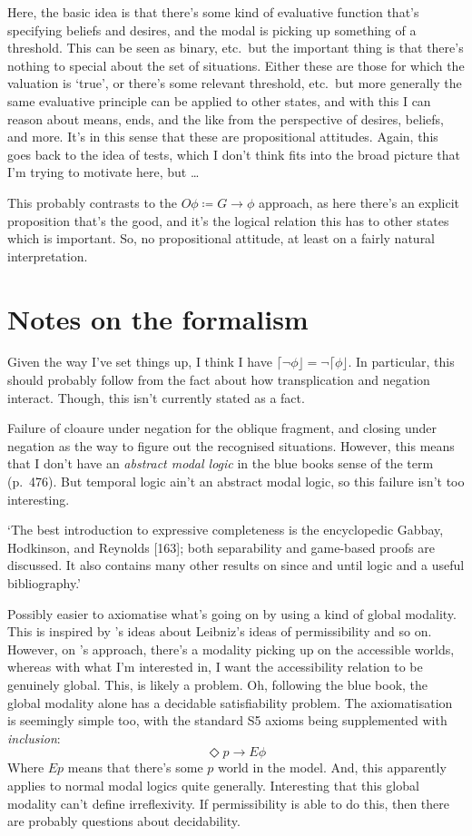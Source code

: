 \documentclass[10pt]{article}
\newcommand{\lattn}{\ensuremath{\lceil}}
\newcommand{\rattn}{\ensuremath{\rfloor}}
\newcommand{\attn}[1]{\ensuremath{\mathord{\lattn{#1}\rattn}}}
\begin{document}
Here, the basic idea is that there's some kind of evaluative function that's specifying beliefs and desires, and the modal is picking up something of a threshold.
This can be seen as binary, etc.\ but the important thing is that there's nothing to special about the set of situations.
Either these are those for which the valuation is `true', or there's some relevant threshold, etc.\ but more generally the same evaluative principle can be applied to other states, and with this I can reason about means, ends, and the like from the perspective of desires, beliefs, and more.
It's in this sense that these are propositional attitudes.
Again, this goes back to the idea of tests, which I don't think fits into the broad picture that I'm trying to motivate here, but \dots

This probably contrasts to the \(O\phi \coloneq G \rightarrow \phi\) approach, as here there's an explicit proposition that's the good, and it's the logical relation this has to other states which is important.
So, no propositional attitude, at least on a fairly natural interpretation.


\section{Notes on the formalism}
\label{sec:notes-formalism}

Given the way I've set things up, I think I have \(\attn{\lnot\phi} = \lnot\attn{\phi}\).
In particular, this should probably follow from the fact about how transplication and negation interact.
Though, this isn't currently stated as a fact.

Failure of cloaure under negation for the oblique fragment, and closing under negation as the way to figure out the recognised situations.
However, this means that I don't have an \emph{abstract modal logic} in the blue books sense of the term (p.\  476).
But temporal logic ain't an abstract modal logic, so this failure isn't too interesting.

`The best introduction to expressive completeness is the encyclopedic Gabbay, Hodkinson, and Reynolds [163]; both separability and game-based proofs are discussed. It also contains many other results on since and until logic and a useful bibliography.'

Possibly easier to axiomatise what's going on by using a kind of global modality.
This is inspired by \citeauthor{van-Benthem:1979aa}'s ideas about Leibniz's ideas of permissibility and so on.
However, on \citeauthor{van-Benthem:1979aa}'s approach, there's a modality picking up on the accessible worlds, whereas with what I'm interested in, I want the accessibility relation to be genuinely global.
This, is likely a problem.
Oh, following the blue book, the global modality alone has a decidable satisfiability problem.
The axiomatisation is seemingly simple too, with the standard S5 axioms being supplemented with \emph{inclusion}:
\[\Diamond p \rightarrow E\phi\]
Where \(Ep\) means that there's some \(p\) world in the model.
And, this apparently applies to normal modal logics quite generally.
Interesting that this global modality can't define irreflexivity.
If permissibility is able to do this, then there are probably questions about decidability.
\end{document}
